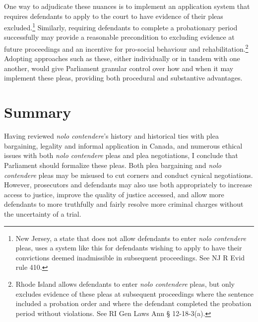 One way to adjudicate these nuances is to implement an application system that requires defendants to apply to the court to have evidence of their pleas excluded.\footnote{New Jersey, a state that does not allow defendants to enter \textit{nolo contendere} pleas, uses a system like this for defendants wishing to apply to have their convictions deemed inadmissible in subsequent proceedings. See NJ R Evid rule 410.} Similarly, requiring defendants to complete a probationary period successfully may provide a reasonable precondition to excluding evidence at future proceedings and an incentive for pro-social behaviour and rehabilitation.\footnote{Rhode Island allows defendants to enter \textit{nolo contendere} pleas, but only excludes evidence of these pleas at subsequent proceedings where the sentence included a probation order and where the defendant completed the probation period without violations. See RI Gen Laws Ann § 12-18-3(a).} Adopting approaches such as these, either individually or in tandem with one another, would give Parliament granular control over how and when it may implement these pleas, providing both procedural and substantive advantages.

\section{Summary}

Having reviewed \textit{nolo contendere}'s history and historical ties with plea bargaining, legality and informal application in Canada, and numerous ethical issues with both \textit{nolo contendere} pleas and plea negotiations, I conclude that Parliament should formalize these pleas. Both plea bargaining and \textit{nolo contendere} pleas may be misused to cut corners and conduct cynical negotiations. However, prosecutors and defendants may also use both appropriately to increase access to justice, improve the quality of justice accessed, and allow more defendants to more truthfully and fairly resolve more criminal charges without the uncertainty of a trial. 